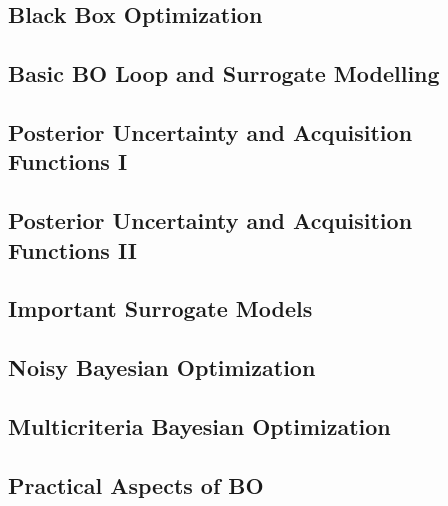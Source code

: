 \subsection{Black Box Optimization}


\subsection{Basic BO Loop and Surrogate Modelling}


\subsection{Posterior Uncertainty and Acquisition Functions I}


\subsection{Posterior Uncertainty and Acquisition Functions II}


\subsection{Important Surrogate Models}


\subsection{Noisy Bayesian Optimization}


\subsection{Multicriteria Bayesian Optimization}


\subsection{Practical Aspects of BO}

